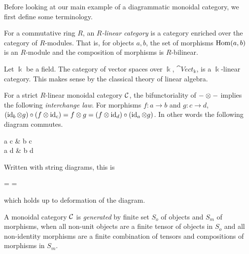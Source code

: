 Before looking at our main example of a diagrammatic monoidal category, we first define some terminology.

\begin{definition}
    For a commutative ring $R$, an \textit{$R$-linear category} is a category enriched over the category of $R$-modules. That is, for objects $a,b$, the set of morphisms $\operatorname{Hom}(a,b)$ is an $R$-module and the composition of morphisms is $R$-bilinear.
\end{definition}

\begin{example}
    Let $\Bbbk$ be a field. The category of vector spaces over $\Bbbk$, $\cat{Vect}_\Bbbk$, is a $\Bbbk$-linear category. This makes sense by the classical theory of linear algebra.
\end{example}

For a strict $R$-linear monoidal category $\mathcal{C}$, the bifunctoriality of $- \otimes -$ implies the following \textit{interchange law}. For morphisms $f: a \to b$ and $g: c \to d$, $(\operatorname{id}_b \otimes g) \circ (f \otimes \operatorname{id}_c) = f \otimes g = (f \otimes \operatorname{id}_d) \circ (\operatorname{id}_a \otimes g)$. In other words the following diagram commutes.

\begin{center}
    \begin{mytikzcd}[sep=large]
        a \tensor c \arrow[r,"f \tensor \id_c"] \arrow[d, "\id_a \tensor g"'] \arrow[dr, "f \tensor g"]
        & b \tensor c \arrow[d, "\id_b \tensor g"] \\
        a \tensor d \arrow[r,"f \tensor \id_d"]
        & b \tensor d
    \end{mytikzcd}
\end{center}
Written with string diagrams, this is
\begin{center}
    = 
    = 
\end{center}
which holds up to deformation of the diagram.


\begin{definition}
    A monoidal category $\mathcal{C}$ is \textit{generated} by finite set $S_o$ of objects and $S_m$ of morphisms, when all non-unit objects are a finite tensor of objects in $S_o$ and all non-identity morphisms are a finite combination of tensors and compositions of morphisms in $S_m$.
\end{definition}

